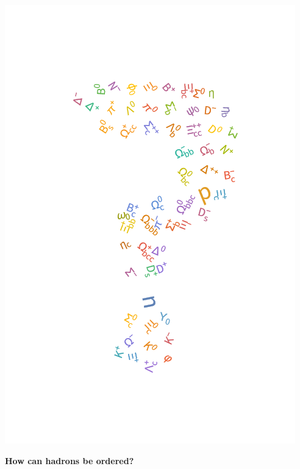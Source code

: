     \subsection{}
\begin{frame}
\begin{minipage}{.3\textwidth}
\includegraphics[width=\textwidth]{Figures Lecture on Hadrons/Hadrons_Questionmark.png}
\end{minipage}
\begin{minipage}{.69\textwidth}
\hspace{-0.5cm}\textbf{How can hadrons be ordered?}
\end{minipage}
\end{frame}

